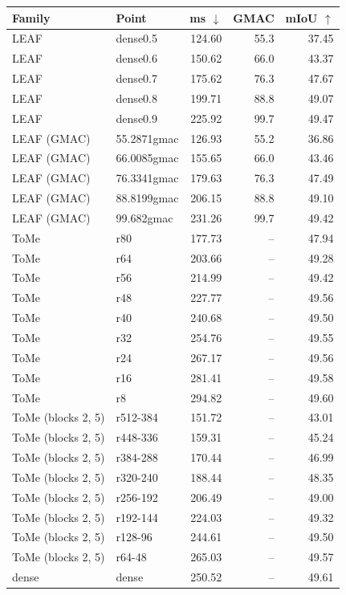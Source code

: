 \begin{tabular}{l l r r r}\toprule
Family & Point & ms $\downarrow$ & GMAC & mIoU $\uparrow$ \\ \midrule
LEAF & dense0.5 & 124.60 & 55.3 & 37.45 \\
LEAF & dense0.6 & 150.62 & 66.0 & 43.37 \\
LEAF & dense0.7 & 175.62 & 76.3 & 47.67 \\
LEAF & dense0.8 & 199.71 & 88.8 & 49.07 \\
LEAF & dense0.9 & 225.92 & 99.7 & 49.47 \\
LEAF (GMAC) & 55.2871gmac & 126.93 & 55.2 & 36.86 \\
LEAF (GMAC) & 66.0085gmac & 155.65 & 66.0 & 43.46 \\
LEAF (GMAC) & 76.3341gmac & 179.63 & 76.3 & 47.49 \\
LEAF (GMAC) & 88.8199gmac & 206.15 & 88.8 & 49.10 \\
LEAF (GMAC) & 99.682gmac & 231.26 & 99.7 & 49.42 \\
ToMe & r80 & 177.73 & -- & 47.94 \\
ToMe & r64 & 203.66 & -- & 49.28 \\
ToMe & r56 & 214.99 & -- & 49.42 \\
ToMe & r48 & 227.77 & -- & 49.56 \\
ToMe & r40 & 240.68 & -- & 49.50 \\
ToMe & r32 & 254.76 & -- & 49.55 \\
ToMe & r24 & 267.17 & -- & 49.56 \\
ToMe & r16 & 281.41 & -- & 49.58 \\
ToMe & r8 & 294.82 & -- & 49.60 \\
ToMe (blocks 2, 5) & r512-384 & 151.72 & -- & 43.01 \\
ToMe (blocks 2, 5) & r448-336 & 159.31 & -- & 45.24 \\
ToMe (blocks 2, 5) & r384-288 & 170.44 & -- & 46.99 \\
ToMe (blocks 2, 5) & r320-240 & 188.44 & -- & 48.35 \\
ToMe (blocks 2, 5) & r256-192 & 206.49 & -- & 49.00 \\
ToMe (blocks 2, 5) & r192-144 & 224.03 & -- & 49.32 \\
ToMe (blocks 2, 5) & r128-96 & 244.61 & -- & 49.50 \\
ToMe (blocks 2, 5) & r64-48 & 265.03 & -- & 49.57 \\
dense & dense & 250.52 & -- & 49.61 \\
\bottomrule\end{tabular}
